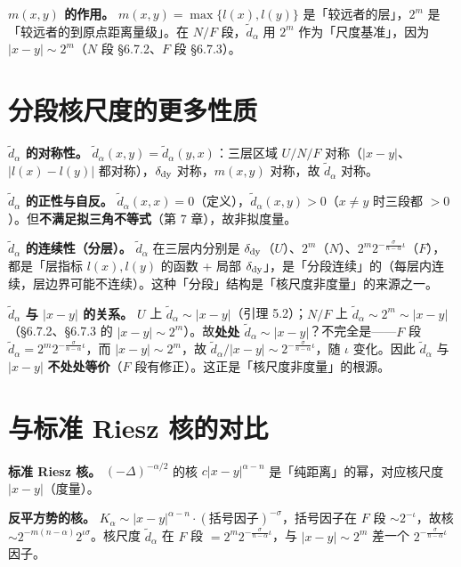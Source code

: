 \documentclass[a4paper,11pt,openany]{ctexbook}
\numberwithin{equation}{chapter}
\numberwithin{figure}{chapter}
\numberwithin{table}{chapter}
\begin{document}
\textbf{$m(x,y)$ 的作用。} $m(x,y)=\max\{l(x),l(y)\}$ 是「较远者的层」，$2^{m}$ 是「较远者的到原点距离量级」。在 $N/F$ 段，$\widetilde d_\alpha$ 用 $2^m$ 作为「尺度基准」，因为 $|x-y|\sim2^m$（$N$ 段 §6.7.2、$F$ 段 §6.7.3）。

\section{分段核尺度的更多性质}

\textbf{$\widetilde d_\alpha$ 的对称性。} $\widetilde d_\alpha(x,y)=\widetilde d_\alpha(y,x)$：三层区域 $U/N/F$ 对称（$|x-y|$、$|l(x)-l(y)|$ 都对称），$\delta_{\rm dy}$ 对称，$m(x,y)$ 对称，故 $\widetilde d_\alpha$ 对称。

\textbf{$\widetilde d_\alpha$ 的正性与自反。} $\widetilde d_\alpha(x,x)=0$（定义），$\widetilde d_\alpha(x,y)>0$（$x\neq y$ 时三段都 $>0$）。但\textbf{不满足拟三角不等式}（第 7 章），故非拟度量。

\textbf{$\widetilde d_\alpha$ 的连续性（分层）。} $\widetilde d_\alpha$ 在三层内分别是 $\delta_{\rm dy}$（$U$）、$2^m$（$N$）、$2^m2^{-\frac{\sigma}{n-\alpha}\iota}$（$F$），都是「层指标 $l(x),l(y)$ 的函数 + 局部 $\delta_{\rm dy}$」，是「分段连续」的（每层内连续，层边界可能不连续）。这种「分段」结构是「核尺度非度量」的来源之一。

\textbf{$\widetilde d_\alpha$ 与 $|x-y|$ 的关系。} $U$ 上 $\widetilde d_\alpha\sim|x-y|$（引理 5.2）；$N/F$ 上 $\widetilde d_\alpha\sim2^m\sim|x-y|$（§6.7.2、§6.7.3 的 $|x-y|\sim2^m$）。故\textbf{处处 $\widetilde d_\alpha\sim|x-y|$}？不完全是——$F$ 段 $\widetilde d_\alpha=2^m2^{-\frac{\sigma}{n-\alpha}\iota}$，而 $|x-y|\sim2^m$，故 $\widetilde d_\alpha/|x-y|\sim2^{-\frac{\sigma}{n-\alpha}\iota}$，随 $\iota$ 变化。因此 $\widetilde d_\alpha$ 与 $|x-y|$ \textbf{不处处等价}（$F$ 段有修正）。这正是「核尺度非度量」的根源。

\section{与标准 Riesz 核的对比}

\textbf{标准 Riesz 核。} $(-\Delta)^{-\alpha/2}$ 的核 $c|x-y|^{\alpha-n}$ 是「纯距离」的幂，对应核尺度 $|x-y|$（度量）。

\textbf{反平方势的核。} $K_\alpha\sim|x-y|^{\alpha-n}\cdot(\text{括号因子})^{-\sigma}$，括号因子在 $F$ 段 $\sim2^{-\iota}$，故核 $\sim2^{-m(n-\alpha)}2^{\iota\sigma}$。核尺度 $\widetilde d_\alpha$ 在 $F$ 段 $=2^m2^{-\frac{\sigma}{n-\alpha}\iota}$，与 $|x-y|\sim2^m$ 差一个 $2^{-\frac{\sigma}{n-\alpha}\iota}$ 因子。
\end{document}
